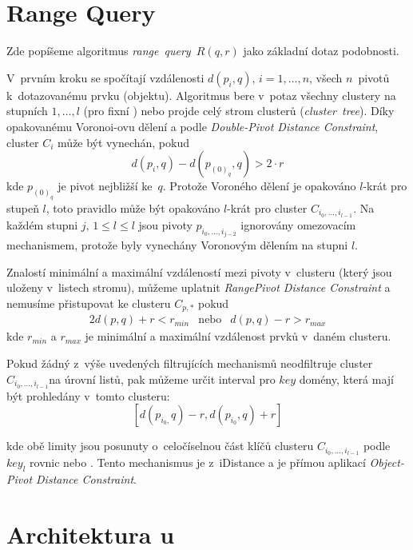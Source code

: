 \section{Range Query\label{sec:Range-Query}}

Zde popíšeme algoritmus \emph{range~query~}$R(q,r)$ jako základní
dotaz podobnosti.

V~prvním kroku se spočítají vzdálenosti $d(p_{i},q),\, i=1,\ldots,n$,
všech $n$~pivotů k~dotazovanému prvku (objektu)\@. Algoritmus
bere v~potaz všechny clustery na stupních $1,\ldots,l$ (pro fixní
\MIndex) nebo projde celý strom clusterů (\emph{cluster~tree})\@.
Díky opakovanému Voronoi-ovu dělení a podle \emph{Double-Pivot Distance
Constraint}\cite{similaritysearch2006}, cluster $C_{i}$ může být
vynechán, pokud
\[
d(p_{i},q)-d(p_{(0)_{q}},q)>2\cdot r
\]
kde $p_{(0)_{q}}$ je pivot nejbližší ke~$q$\@. Protože Voroného
dělení je opakováno $l$-krát pro stupeň $l$, toto pravidlo může
být opakováno $l$-krát pro cluster $C_{i_{0},\ldots,i_{l-1}}$\@.
Na každém stupni $j,\,1\leq l\leq l$ jsou pivoty $p_{i_{0},\ldots,i_{j-2}}$
ignorovány omezovacím mechanismem, protože byly vynechány Voronovým
dělením na stupni $l$\@.

Znalostí minimální a maximální vzdáleností mezi pivoty v~clusteru
(který jsou uloženy v~listech stromu), můžeme uplatnit \emph{RangePivot
Distance Constraint}\cite{similaritysearch2006} a nemusíme přistupovat
ke clusteru $C_{p,*}$ pokud
\begin{alignat*}{2}
d(p,q)+r<r_{min} & \textrm{nebo} & d(p,q)-r>r_{max}
\end{alignat*}
kde $r_{min}$ a $r_{max}$ je minimální a maximální vzdálenost prvků
v~daném clusteru\@.

Pokud žádný z~výše uvedených filtrujících mechanismů neodfiltruje
cluster $C_{i_{0},\ldots,i_{l-1}}$na úrovní listů, pak můžeme určit
interval pro $key$ domény, která mají být prohledány v~tomto clusteru:
\[
[d(p_{i_{0},}q)-r,d(p_{i_{0}},q)+r]
\]

kde obě limity jsou posunuty o~celočíselnou část klíčů clusteru $C_{i_{0},\ldots,i_{l-1}}$ podle
$key_{l}$ rovnic  nebo .
Tento mechanismus je  \linebreak z~iDistance a je přímou aplikací
\emph{Object-Pivot Distance Constraint}\cite{similaritysearch2006}\@.

\section{Architektura \MIndex u}

